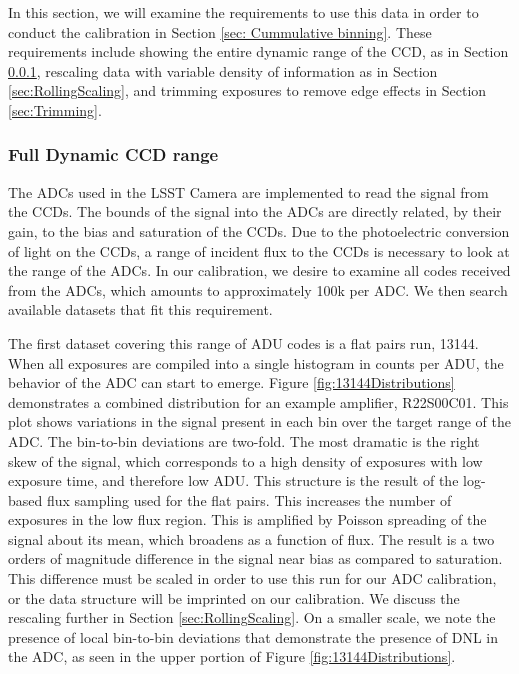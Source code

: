 \documentclass[linenumbers]{aastex7}
\begin{document}
In this section, we will examine the requirements to use this data in order to conduct the calibration in Section \ref{sec: Cummulative binning}. 
These requirements include showing the entire dynamic range of the CCD, as in Section \ref{sec:RangeADC}, rescaling data with variable density of information as in Section \ref{sec:RollingScaling}, and trimming exposures to remove edge effects in Section \ref{sec:Trimming}.

\subsubsection{Full Dynamic CCD range}
\label{sec:RangeADC}

The ADCs used in the LSST Camera are implemented to read the signal from the CCDs. 
The bounds of the signal into the ADCs are directly related, by their gain, to the bias and saturation of the CCDs.  
Due to the photoelectric conversion of light on the CCDs, a range of incident flux to the CCDs is necessary to look at the range of the ADCs.
In our calibration, we desire to examine all codes received from the ADCs, which amounts to approximately 100k per ADC.  
We then search available datasets that fit this requirement.

The first dataset covering this range of ADU codes is a flat pairs run, 13144. 
When all exposures are compiled into a single histogram in counts per ADU, the behavior of the ADC can start to emerge.
Figure \ref{fig:13144Distributions} demonstrates a combined distribution for an example amplifier, R22S00C01.
This plot shows variations in the signal present in each bin over the target range of the ADC.
The bin-to-bin deviations are two-fold. 
The most dramatic is the right skew of the signal, which corresponds to a high density of exposures with low exposure time, and therefore low ADU.
This structure is the result of the log-based flux sampling used for the flat pairs. 
This increases the number of exposures in the low flux region. 
This is amplified by Poisson spreading of the signal about its mean, which broadens as a function of flux. 
The result is a two orders of magnitude difference in the signal near bias as compared to saturation.
This difference must be scaled in order to use this run for our ADC calibration, or the data structure will be imprinted on our calibration.
We discuss the rescaling further in Section \ref{sec:RollingScaling}. 
On a smaller scale, we note the presence of local bin-to-bin deviations that demonstrate the presence of DNL in the ADC, as seen in the upper portion of Figure \ref{fig:13144Distributions}. 
\end{document}
